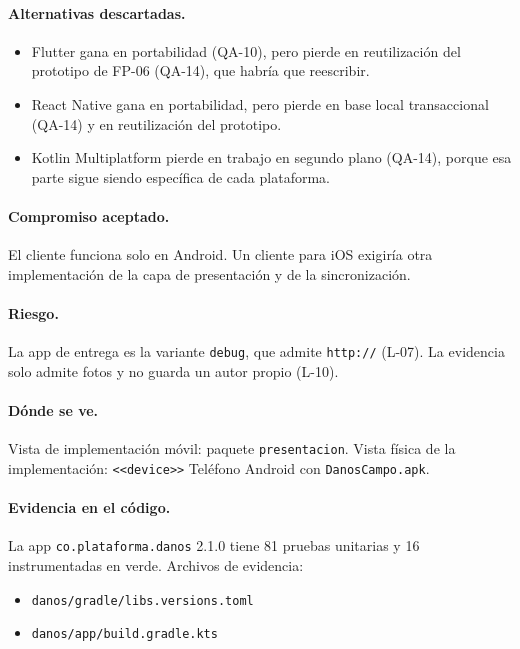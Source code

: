 \paragraph{Alternativas descartadas.}
\begin{itemize}
  \item Flutter gana en portabilidad (QA-10), pero pierde en reutilización del prototipo de FP-06 (QA-14), que habría que reescribir.
  \item React Native gana en portabilidad, pero pierde en base local transaccional (QA-14) y en reutilización del prototipo.
  \item Kotlin Multiplatform pierde en trabajo en segundo plano (QA-14), porque esa parte sigue siendo específica de cada plataforma.
\end{itemize}

\paragraph{Compromiso aceptado.} El cliente funciona solo en Android.
Un cliente para iOS exigiría otra implementación de la capa de presentación y de la sincronización.

\paragraph{Riesgo.} La app de entrega es la variante \texttt{debug}, que admite \texttt{http://} (L-07).
La evidencia solo admite fotos y no guarda un autor propio (L-10).

\paragraph{Dónde se ve.} Vista de implementación móvil: paquete \texttt{presentacion}.
Vista física de la implementación: \texttt{<<device>>} Teléfono Android con \texttt{DanosCampo.apk}.

\paragraph{Evidencia en el código.} La app \texttt{co.plataforma.danos} 2.1.0 tiene 81 pruebas unitarias y 16 instrumentadas en verde.
Archivos de evidencia:
{\raggedright
\begin{itemize}
  \item \texttt{danos/\br{}gradle/\br{}libs.versions.toml}
  \item \texttt{danos/\br{}app/\br{}build.gradle.kts}
\end{itemize}
\par}

